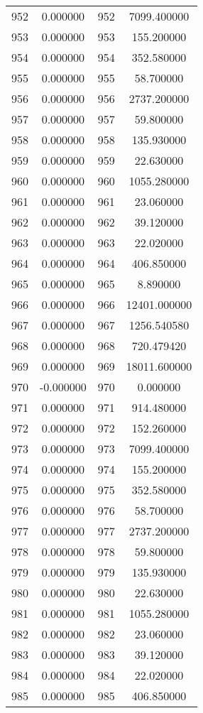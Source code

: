 \documentclass[12pt]{article}
\begin{document}
\begin{longtable}{@{}cccc@{}}
952 & 0.000000 & 952 & 7099.400000 \\
953 & 0.000000 & 953 & 155.200000 \\
954 & 0.000000 & 954 & 352.580000 \\
955 & 0.000000 & 955 & 58.700000 \\
956 & 0.000000 & 956 & 2737.200000 \\
957 & 0.000000 & 957 & 59.800000 \\
958 & 0.000000 & 958 & 135.930000 \\
959 & 0.000000 & 959 & 22.630000 \\
960 & 0.000000 & 960 & 1055.280000 \\
961 & 0.000000 & 961 & 23.060000 \\
962 & 0.000000 & 962 & 39.120000 \\
963 & 0.000000 & 963 & 22.020000 \\
964 & 0.000000 & 964 & 406.850000 \\
965 & 0.000000 & 965 & 8.890000 \\
966 & 0.000000 & 966 & 12401.000000 \\
967 & 0.000000 & 967 & 1256.540580 \\
968 & 0.000000 & 968 & 720.479420 \\
969 & 0.000000 & 969 & 18011.600000 \\
970 & -0.000000 & 970 & 0.000000 \\
971 & 0.000000 & 971 & 914.480000 \\
972 & 0.000000 & 972 & 152.260000 \\
973 & 0.000000 & 973 & 7099.400000 \\
974 & 0.000000 & 974 & 155.200000 \\
975 & 0.000000 & 975 & 352.580000 \\
976 & 0.000000 & 976 & 58.700000 \\
977 & 0.000000 & 977 & 2737.200000 \\
978 & 0.000000 & 978 & 59.800000 \\
979 & 0.000000 & 979 & 135.930000 \\
980 & 0.000000 & 980 & 22.630000 \\
981 & 0.000000 & 981 & 1055.280000 \\
982 & 0.000000 & 982 & 23.060000 \\
983 & 0.000000 & 983 & 39.120000 \\
984 & 0.000000 & 984 & 22.020000 \\
985 & 0.000000 & 985 & 406.850000 \\

\end{longtable}
\end{document}
